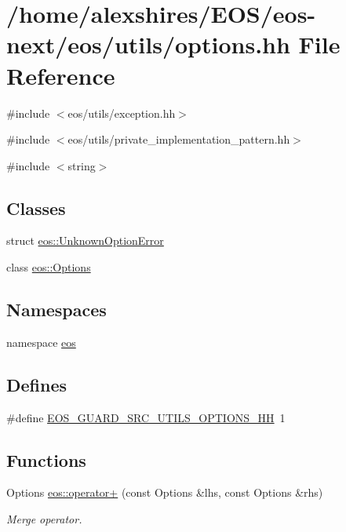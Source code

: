 \hypertarget{options_8hh}{
\section{/home/alexshires/EOS/eos-\/next/eos/utils/options.hh File Reference}
\label{options_8hh}
}
{\ttfamily \#include $<$eos/utils/exception.hh$>$}\par
{\ttfamily \#include $<$eos/utils/private\_\-implementation\_\-pattern.hh$>$}\par
{\ttfamily \#include $<$string$>$}\par
\subsection*{Classes}
\begin{DoxyCompactItemize}
\item 
struct \hyperlink{structeos_1_1UnknownOptionError}{eos::UnknownOptionError}
\item 
class \hyperlink{classeos_1_1Options}{eos::Options}
\end{DoxyCompactItemize}
\subsection*{Namespaces}
\begin{DoxyCompactItemize}
\item 
namespace \hyperlink{namespaceeos}{eos}
\end{DoxyCompactItemize}
\subsection*{Defines}
\begin{DoxyCompactItemize}
\item 
\#define \hyperlink{options_8hh_a272d2c4d81b3724465284b8966de0f2c}{EOS\_\-GUARD\_\-SRC\_\-UTILS\_\-OPTIONS\_\-HH}~1
\end{DoxyCompactItemize}
\subsection*{Functions}
\begin{DoxyCompactItemize}
\item 
Options \hyperlink{namespaceeos_a41f7ab5320df3415314366aef9a258bf}{eos::operator+} (const Options \&lhs, const Options \&rhs)
\begin{DoxyCompactList}\small\item\em Merge operator. \item\end{DoxyCompactList}\end{DoxyCompactItemize}


